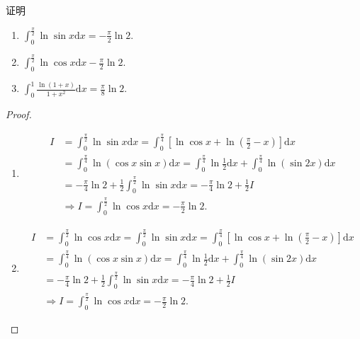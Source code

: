 \documentclass[../../main.tex]{subfiles}
\begin{document}
\begin{proposition}\label{example:常见积分1}
证明
\begin{enumerate}
\item \(\int_{0}^{\frac{\pi}{2}} \ln\sin x\mathrm{d}x=-\frac{\pi}{2}\ln 2.\)

\item \(\int_{0}^{\frac{\pi}{2}} \ln\cos x\mathrm{d}x-\frac{\pi}{2}\ln 2.\)

\item \(\int_{0}^{1} \frac{\ln(1 + x)}{1 + x^2}\mathrm{d}x=\frac{\pi}{8}\ln 2.\)
\end{enumerate}
\end{proposition}
\begin{proof}
\begin{enumerate}
\item \begin{align*}
I&=\int_0^{\frac{\pi}{2}}{\ln\sin x\mathrm{d}x}=\int_0^{\frac{\pi}{4}}{\left[ \ln\cos x+\ln \left( \frac{\pi}{2}-x \right) \right] \mathrm{d}x}
\\
&=\int_0^{\frac{\pi}{4}}{\ln \left( \cos x\sin x \right) \mathrm{d}x}=\int_0^{\frac{\pi}{4}}{\ln \frac{1}{2}\mathrm{d}x}+\int_0^{\frac{\pi}{4}}{\ln \left( \sin 2x \right) \mathrm{d}x}
\\
&=-\frac{\pi}{4}\ln 2+\frac{1}{2}\int_0^{\frac{\pi}{2}}{\ln\sin x\mathrm{d}x}=-\frac{\pi}{4}\ln 2+\frac{1}{2}I
\\
&\Longrightarrow I=\int_0^{\frac{\pi}{2}}{\ln\cos x\mathrm{d}x}=-\frac{\pi}{2}\ln 2.
\end{align*}

\item \begin{align*}
I&=\int_0^{\frac{\pi}{2}}{\ln\cos x\mathrm{d}x}=\int_0^{\frac{\pi}{2}}{\ln\sin x\mathrm{d}x}=\int_0^{\frac{\pi}{4}}{\left[ \ln\cos x+\ln \left( \frac{\pi}{2}-x \right) \right] \mathrm{d}x}
\\
&=\int_0^{\frac{\pi}{4}}{\ln \left( \cos x\sin x \right) \mathrm{d}x}=\int_0^{\frac{\pi}{4}}{\ln \frac{1}{2}\mathrm{d}x}+\int_0^{\frac{\pi}{4}}{\ln \left( \sin 2x \right) \mathrm{d}x}
\\
&=-\frac{\pi}{4}\ln 2+\frac{1}{2}\int_0^{\frac{\pi}{2}}{\ln\sin x\mathrm{d}x}=-\frac{\pi}{4}\ln 2+\frac{1}{2}I
\\
&\Longrightarrow I=\int_0^{\frac{\pi}{2}}{\ln\cos x\mathrm{d}x}=-\frac{\pi}{2}\ln 2.
\end{align*}


\end{enumerate}
\end{proof}
\end{document}
